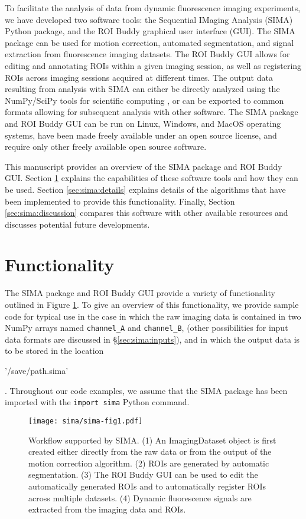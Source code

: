 To facilitate the analysis of data from dynamic fluorescence imaging experiments,
we have developed two software tools:
the Sequential IMaging Analysis (SIMA) Python package,
and the ROI Buddy graphical user interface (GUI). 
The SIMA package can be used for motion correction, automated segmentation,
and signal extraction from fluorescence imaging datasets.
The ROI Buddy GUI allows for editing and annotating ROIs
within a given imaging session, as well as registering ROIs across imaging sessions acquired at different times.
The output data resulting from analysis with SIMA can either be directly
analyzed using the NumPy/SciPy tools for scientific computing 
\citep{Oliphant2007, Jones2001}, or can be exported to common formats
allowing for subsequent analysis with other software.
The SIMA package and ROI Buddy GUI can be run on Linux, Windows, and MacOS
operating systems, have been made freely available under an open source
license, and require only other freely available open source software.

This manuscript provides an overview of the SIMA package and ROI Buddy GUI.
Section \ref{sec:sima:functionality} explains the capabilities of these software
tools and how they can be used.
Section \ref{sec:sima:details} explains details of the algorithms that have
been implemented to provide this functionality.
Finally, 
Section \ref{sec:sima:discussion} compares this software with other
available resources and discusses potential future developments.


\section{Functionality}\label{sec:sima:functionality}
The SIMA package and ROI Buddy GUI provide a variety of functionality outlined in Figure \ref{fig:sima:workflow}.
To give an overview of this functionality, we provide sample code for typical use
in the case in which the raw imaging data is contained in two NumPy arrays
named \verb|channel_A| and \verb|channel_B|,
(other possibilities for input data formats are discussed in \S\ref{sec:sima:inputs}),
and in which the output data is to be stored in the location 
\begin{verb}'/save/path.sima'\end{verb}.
Throughout our code examples, we assume that the SIMA package has been imported
with the \verb|import sima| Python command.

\begin{figure}[ht]
\centering
\texttt{[image: sima/sima-fig1.pdf]}
\caption[Workflow supported by SIMA]{
 Workflow supported by SIMA. 
 (1) An ImagingDataset object is first created either directly from the raw data
 or from the output of the motion correction algorithm.
 (2) ROIs are generated by automatic segmentation.
 (3) The ROI Buddy GUI can be used to edit the automatically generated ROIs and to
 automatically register ROIs across multiple datasets.
 (4) Dynamic fluorescence signals are extracted from the imaging data and ROIs.}
 \label{fig:sima:workflow}
\end{figure}

